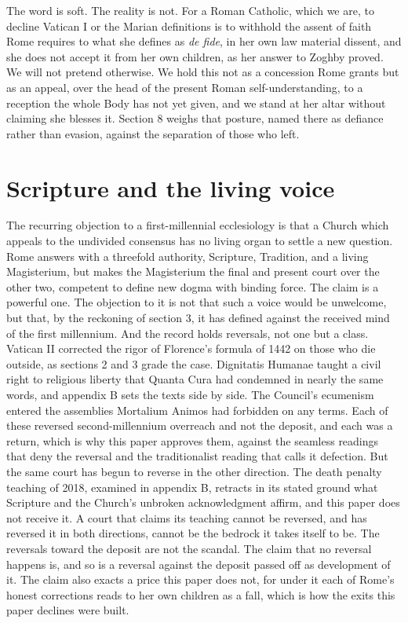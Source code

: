 \documentclass[11pt,twoside]{article}
\newcommand{\unit}[1]{\needspace{3\baselineskip}\par\medskip{\normalfont\bfseries\color{subhead}#1}\par\nobreak\smallskip}
\begin{document}
\unit{On ``declining,'' and its cost.}
The word is soft. The reality is not. For a Roman Catholic, which we are, to decline Vatican I or the Marian definitions is to withhold the assent of faith Rome requires to what she defines as \emph{de fide}, in her own law material dissent, and she does not accept it from her own children, as her answer to Zoghby proved. We will not pretend otherwise. We hold this not as a concession Rome grants but as an appeal, over the head of the present Roman self-understanding, to a reception the whole Body has not yet given, and we stand at her altar without claiming she blesses it. Section 8 weighs that posture, named there as defiance rather than evasion, against the separation of those who left.

\section{Scripture and the living voice}


The recurring objection to a first-millennial ecclesiology is that a Church which appeals to the undivided consensus has no living organ to settle a new question. Rome answers with a threefold authority, Scripture, Tradition, and a living Magisterium, but makes the Magisterium the final and present court over the other two, competent to define new dogma with binding force. The claim is a powerful one. The objection to it is not that such a voice would be unwelcome, but that, by the reckoning of section 3, it has defined against the received mind of the first millennium. And the record holds reversals, not one but a class. Vatican II corrected the rigor of Florence's formula of 1442 on those who die outside, as sections 2 and 3 grade the case. Dignitatis Humanae taught a civil right to religious liberty that Quanta Cura had condemned in nearly the same words, and appendix B sets the texts side by side. The Council's ecumenism entered the assemblies Mortalium Animos had forbidden on any terms. Each of these reversed second-millennium overreach and not the deposit, and each was a return, which is why this paper approves them, against the seamless readings that deny the reversal and the traditionalist reading that calls it defection. But the same court has begun to reverse in the other direction. The death penalty teaching of 2018, examined in appendix B, retracts in its stated ground what Scripture and the Church's unbroken acknowledgment affirm, and this paper does not receive it. A court that claims its teaching cannot be reversed, and has reversed it in both directions, cannot be the bedrock it takes itself to be. The reversals toward the deposit are not the scandal. The claim that no reversal happens is, and so is a reversal against the deposit passed off as development of it. The claim also exacts a price this paper does not, for under it each of Rome's honest corrections reads to her own children as a fall, which is how the exits this paper declines were built.
\end{document}
